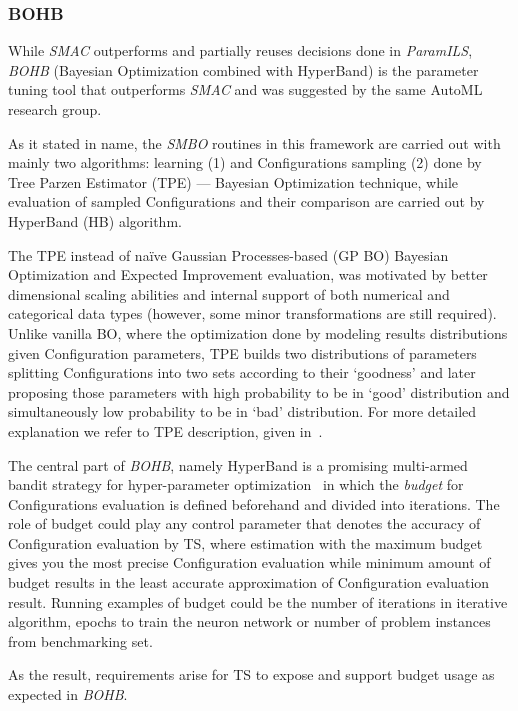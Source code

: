 \subsubsection{BOHB~\cite{falkner2018bohb}}\label{bg: bohb}
While \textit{SMAC} outperforms and partially reuses decisions done in \textit{ParamILS}, \textit{BOHB} (Bayesian Optimization combined with HyperBand) is the parameter tuning tool that outperforms \textit{SMAC} and was suggested by the same AutoML research group.

As it stated in name, the \textit{SMBO} routines in this framework are carried out with mainly two algorithms: learning (1) and Configurations sampling (2) done by Tree Parzen Estimator (TPE) — Bayesian Optimization technique, while evaluation of sampled Configurations and their comparison are carried out by HyperBand (HB) algorithm.

The TPE instead of na\"ive Gaussian Processes-based (GP BO) Bayesian Optimization and Expected Improvement evaluation, was motivated by better dimensional scaling abilities and internal support of both numerical and categorical data types (however, some minor transformations are still required). 
Unlike vanilla BO, where the optimization done by modeling results distributions given Configuration parameters, TPE builds two distributions of parameters splitting Configurations into two sets according to their `goodness' and later proposing those parameters with high probability to be in `good' distribution and simultaneously low probability to be in `bad' distribution. For more detailed explanation we refer to TPE description, given in~\cite{bergstra2011algorithms}.

The central part of \textit{BOHB}, namely HyperBand is a promising multi-armed bandit strategy for hyper-parameter optimization~\cite{li2017hyperband} in which the \textit{budget} for Configurations evaluation is defined beforehand and divided into iterations. The role of budget could play any control parameter that denotes the accuracy of Configuration evaluation by TS, where estimation with the maximum budget gives you the most precise Configuration evaluation while minimum amount of budget results in the least accurate approximation of Configuration evaluation result.
Running examples of budget could be the number of iterations in iterative algorithm, epochs to train the neuron network or number of problem instances from benchmarking set.

As the result, requirements arise for TS to expose and support budget usage as expected in \textit{BOHB}.

